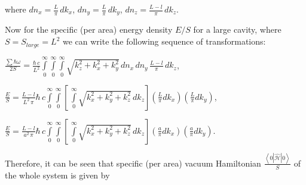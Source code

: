 \documentclass[twoside, 10pt]{article}
\begin{document}
\begin{multicols}{2}
where \(dn_x = \frac{L}{\pi}\,dk_x\), \(dn_y = \frac{L}{\pi}\,dk_y\),
\(dn_z = \frac{L-l}{\pi}\,dk_z\).

    Now for the specific (per area) energy density \(E/S\) for a large cavity, where
\(S = S_{large} = L^2\) we can write the following sequence of transformations:

\noindent
\(\frac{\sum\hbar\omega}{2 S} = \frac{\hbar\,c}{L^2}\int\limits_{0}^{\infty}\int\limits_{0}^{\infty}\int\limits_{0}^{\infty}\sqrt{k_z^2+k_x^2+k_y^2}\,dn_x\,dn_y\,\frac{L-l}{\pi}\,dk_z\),


\noindent
\(\frac{E}{S} = \frac{L-l}{L^2\,\pi}\hbar\,c\int\limits_{0}^{\infty}\int\limits_{0}^{\infty}\left[\,\int\limits_{0}^{\infty}\sqrt{k_x^2+k_y^2+k_z^2}\,dk_z\right] \left(\frac{L}{\pi}dk_x\right) \left(\frac{L}{\pi}dk_y\right)\),

\noindent
\(\frac{E}{S} = \frac{L-l}{a^2\,\pi}\hbar\,c\int\limits_{0}^{\infty}\int\limits_{0}^{\infty}\left[\,\int\limits_{0}^{\infty}\sqrt{k_x^2+k_y^2+k_z^2}\,dk_z\right] \left(\frac{a}{\pi}dk_x\right) \left(\frac{a}{\pi}dk_y\right)\).

    Therefore, it can be seen that specific (per area) vacuum Hamiltonian
\(\frac{\left<0|\hat{\mathcal{H}}|0\right>}{S}\) of the whole system is
given by

\end{multicols}

\end{document}
